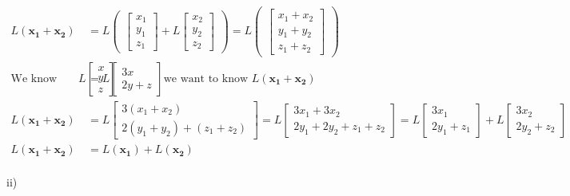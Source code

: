 \documentclass[10pt,a4paper]{article}
\numberwithin{equation}{section}
\begin{document}
\begin{align*}
	L(\mathbf{x_1+x_2})&=L\begin{pmatrix}\begin{bmatrix}
		x_{1} \\
		y_{1} \\
		z_{1}
	\end{bmatrix} +L\begin{bmatrix}
	x_{2} \\
	y_{2} \\
	z_{2}
\end{bmatrix}\end{pmatrix} = L\begin{pmatrix}\begin{bmatrix}
x_{1}+x_{2} \\
y_{1}+y_{2} \\
z_{1}+z_{2}
\end{bmatrix}\end{pmatrix} \\
\text{We know that } L\begin{bmatrix}
	x \\
	y \\
	z
\end{bmatrix}&=L\begin{bmatrix}
	3x \\
	2y+z
\end{bmatrix} \text{we want to know }L(\mathbf{x_1+x_2}) \\
	L(\mathbf{x_1+x_2})&=L\begin{bmatrix}
	3(x_{1}+x_{2}) \\
	2(y_{1}+y_{2})+(z_{1}+z_{2}) 
\end{bmatrix} = L\begin{bmatrix}
3x_{1}+3x_{2} \\
2y_{1}+2y_{2}+z_{1}+z_{2}
\end{bmatrix} = L\begin{bmatrix}
3x_{1} \\
2y_{1}+z_{1}
\end{bmatrix} + L\begin{bmatrix}
3x_{2} \\
2y_{2}+z_{2}
\end{bmatrix} \\
L(\mathbf{x_1+x_2})&=L(\mathbf{x_1})+L(\mathbf{x_2})
\end{align*}
~\\
ii) 
\end{document}
